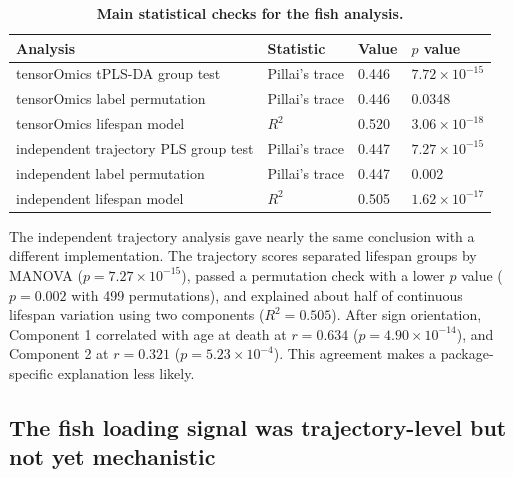 \documentclass[11pt,a4paper]{article}
\begin{document}
\begin{table}[!htbp]
  \centering
  \caption{\textbf{Main statistical checks for the fish analysis.}}
  \label{tab:fish_stats}
  \footnotesize
  \begin{tabular}{llll}
    \toprule
    Analysis & Statistic & Value & $p$ value \\
    \midrule
    tensorOmics tPLS-DA group test & Pillai's trace & 0.446 & $7.72\times10^{-15}$ \\
    tensorOmics label permutation & Pillai's trace & 0.446 & 0.0348 \\
    tensorOmics lifespan model & $R^2$ & 0.520 & $3.06\times10^{-18}$ \\
    independent trajectory PLS group test & Pillai's trace & 0.447 & $7.27\times10^{-15}$ \\
    independent label permutation & Pillai's trace & 0.447 & 0.002 \\
    independent lifespan model & $R^2$ & 0.505 & $1.62\times10^{-17}$ \\
    \bottomrule
  \end{tabular}
\end{table}

The independent trajectory analysis gave nearly the same conclusion with a different implementation. The trajectory scores separated lifespan groups by MANOVA ($p=7.27\times10^{-15}$), passed a permutation check with a lower $p$ value ($p=0.002$ with 499 permutations), and explained about half of continuous lifespan variation using two components ($R^2=0.505$). After sign orientation, Component 1 correlated with age at death at $r=0.634$ ($p=4.90\times10^{-14}$), and Component 2 at $r=0.321$ ($p=5.23\times10^{-4}$). This agreement makes a package-specific explanation less likely.

\subsection{The fish loading signal was trajectory-level but not yet mechanistic}
\end{document}

